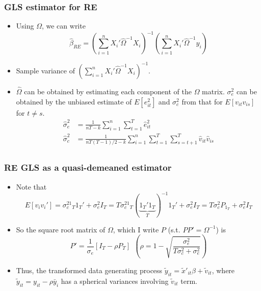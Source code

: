 \documentclass[aspectratio=169]{beamer}
\begin{document}
\begin{frame}
\frametitle{GLS estimator for RE}
\begin{itemize}
\item Using $\Omega$, we can write
\[
\hat{\beta}_{RE} = \left(\sum_{i=1}^n X_i'\widehat{\Omega}^{-1}X_i\right)^{-1}\left(\sum_{i=1}^n X_i'\widehat{\Omega}^{-1}y_i\right)
\]
\item Sample variance of $\left(\sum_{i=1}^n X_i'\widehat{\Omega}^{-1}X_i\right)^{-1}$. 
\item $\widehat{\Omega}$ can be obtained by estimating each component of the $\Omega$ matrix. $\sigma_e^2$ can be obtained by the unbiased estimate of $E[e_{it}^2]$ and $\sigma_c^2$ from that for $E[v_{it}v_{is}]$ for $t\neq s$. 
\[
\begin{aligned}
\hat{\sigma}_e^2&=\frac{1}{nT-k}\sum_{i=1}^n\sum_{t=1}^T \hat{e}_{it}^2\\
\hat{\sigma}_c^2&=\frac{1}{nT(T-1)/2-k}\sum_{i=1}^n\sum_{t=1}^T\sum_{s=t+1}^T \hat{v}_{it}\hat{v}_{is}\\
\end{aligned}
\]

\end{itemize}
\end{frame}

\begin{frame}
\frametitle{RE GLS as a quasi-demeaned estimator}
\begin{itemize}
\item Note that 
\[
E[v_iv_i']=\sigma_c^21_T1_T'+\sigma_e^2I_T=T\sigma_c^21_T(\underbrace{1_T'1_T}_{T})^{-1}1_T'+\sigma_e^2I_T=T\sigma_c^2P_{1_T}+\sigma_e^2I_T
\]
\item So the square root matrix of $\Omega$, which I write $P$ (s.t. $PP'=\Omega^{-1}$) is
\[
P'=\frac{1}{\sigma_e}[I_T - \rho P_T] \ \ \left(\rho = 1-\sqrt{\frac{\sigma_e^2}{T\sigma_c^2+\sigma_e^2}}\right)
\]
\item Thus, the transformed data generating process $\tilde{y}_{it}=\tilde{x}'_{it}\beta+\tilde{v}_{it}$, where $\tilde{y}_{it}=y_{it}-\rho\bar{y}_i$ has a spherical variances involving $\tilde{v}_{it}$ term.

\end{itemize}
\end{frame}
\end{document}
